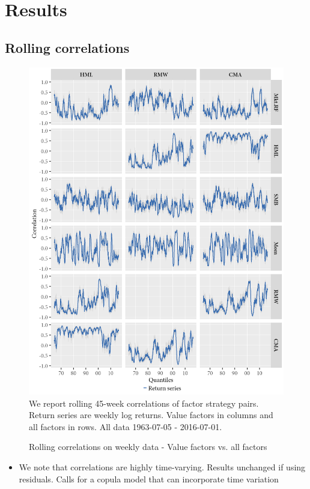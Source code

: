 \section{Results}
\subsection{Rolling correlations}
\begin{figure}[H]
  \caption{Rolling correlations on weekly data - Value factors vs. all factors}
  \label{diag:rolling45}
  \toprule
  \centering
  \begin{minipage}{\textwidth}
  \includegraphics[scale=1]{graphics/rolling45.png}  
  \bottomrule
  \vspace{3mm}
  \footnotesize
  We report rolling 45-week correlations of factor strategy pairs. Return series are weekly log returns. Value factors in columns and all factors in rows. All data 1963-07-05 - 2016-07-01.
  \end{minipage}
\end{figure}
\begin{itemize}
  \item We note that correlations are highly time-varying. Results unchanged if using residuals. Calls for a copula model that can incorporate time variation
\end{itemize}
